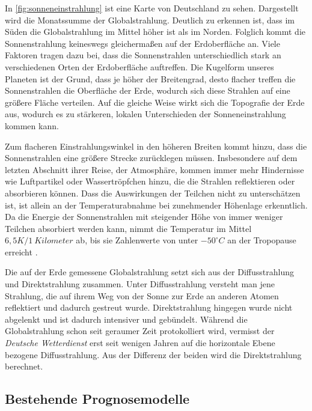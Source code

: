 \documentclass[12pt, a4paper]{article}
\begin{document}
In \autoref{fig:sonneneinstrahlung} ist eine Karte von Deutschland zu sehen. Dargestellt wird die Monatssumme der Globalstrahlung. Deutlich zu erkennen ist, dass im Süden die Globalstrahlung im Mittel höher ist als im Norden. Folglich kommt die Sonnenstrahlung keineswegs gleichermaßen auf der Erdoberfläche an. Viele Faktoren tragen dazu bei, dass die Sonnenstrahlen unterschiedlich stark an verschiedenen Orten der Erdoberfläche auftreffen. Die Kugelform unseres Planeten ist der Grund, dass je höher der Breitengrad, desto flacher treffen die Sonnenstrahlen die Oberfläche der Erde, wodurch sich diese Strahlen auf eine größere Fläche verteilen. Auf die gleiche Weise wirkt sich die Topografie der Erde aus, wodurch es zu stärkeren, lokalen Unterschieden der Sonneneinstrahlung kommen kann.

Zum flacheren Einstrahlungswinkel in den höheren Breiten kommt hinzu, dass die Sonnenstrahlen eine größere Strecke zurücklegen müssen. Insbesondere auf dem letzten Abschnitt ihrer Reise, der Atmosphäre, kommen immer mehr Hindernisse wie Luftpartikel oder Wassertröpfchen hinzu, die die Strahlen reflektieren oder absorbieren können. Dass die Auswirkungen der Teilchen nicht zu unterschätzen ist, ist allein an der Temperaturabnahme bei zunehmender Höhenlage erkenntlich. Da die Energie der Sonnenstrahlen mit steigender Höhe von immer weniger Teilchen absorbiert werden kann, nimmt die Temperatur im Mittel $6,5 K/ 1\ Kilometer$  ab, bis sie Zahlenwerte von unter $-50 ^\circ C$ an der Tropopause erreicht \cite{ws:dwd}.


Die auf der Erde gemessene Globalstrahlung setzt sich aus der Diffusstrahlung und Direktstrahlung zusammen. Unter Diffusstrahlung versteht man jene Strahlung, die auf ihrem Weg von der Sonne zur Erde an anderen Atomen reflektiert und dadurch gestreut wurde. Direktstrahlung hingegen wurde nicht abgelenkt und ist dadurch intensiver und gebündelt. Während die Globalstrahlung schon seit geraumer Zeit protokolliert wird,  vermisst der \textit{Deutsche Wetterdienst} erst seit wenigen Jahren auf die horizontale Ebene bezogene Diffusstrahlung. Aus der Differenz der beiden wird die Direktstrahlung berechnet. 

\subsection{Bestehende Prognosemodelle}
\label{subsec:existing_predictions}
\end{document}
